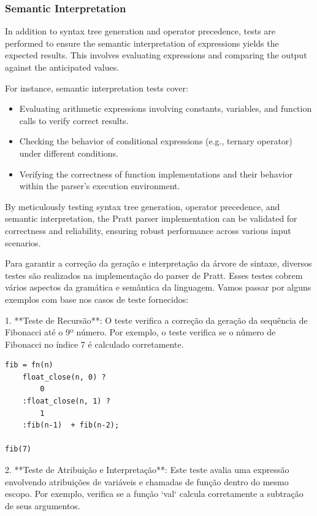 \documentclass[english, 
               brazil, 
               bsc] %
               {dcomp-abntex2}
\begin{document}
\subsubsection{Semantic Interpretation}

In addition to syntax tree generation and operator precedence, tests are performed to ensure the semantic interpretation of expressions yields the expected results. This involves evaluating expressions and comparing the output against the anticipated values.

For instance, semantic interpretation tests cover:

\begin{itemize}
    \item Evaluating arithmetic expressions involving constants, variables, and function calls to verify correct results.
    \item Checking the behavior of conditional expressions (e.g., ternary operator) under different conditions.
    \item Verifying the correctness of function implementations and their behavior within the parser's execution environment.
\end{itemize}

By meticulously testing syntax tree generation, operator precedence, and semantic interpretation, the Pratt parser implementation can be validated for correctness and reliability, ensuring robust performance across various input scenarios.

Para garantir a correção da geração e interpretação da árvore de sintaxe, diversos testes são realizados na implementação do parser de Pratt. Esses testes cobrem vários aspectos da gramática e semântica da linguagem. Vamos passar por alguns exemplos com base nos casos de teste fornecidos:

1. **Teste de Recursão**: O teste verifica a correção da geração da sequência de Fibonacci até o 9º número. Por exemplo, o teste verifica se o número de Fibonacci no índice 7 é calculado corretamente.

\begin{verbatim}
fib = fn(n)  
    float_close(n, 0) ? 
        0
    :float_close(n, 1) ?
        1
    :fib(n-1)  + fib(n-2);

fib(7)
\end{verbatim}

2. **Teste de Atribuição e Interpretação**: Este teste avalia uma expressão envolvendo atribuições de variáveis e chamadas de função dentro do mesmo escopo. Por exemplo, verifica se a função `val` calcula corretamente a subtração de seus argumentos.
\end{document}
